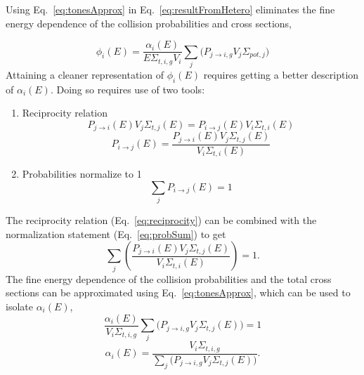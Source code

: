 \documentclass[10pt]{article}
\begin{document}
Using Eq.~\ref{eq:tonesApprox} in Eq.~\ref{eq:resultFromHetero} eliminates the fine energy dependence of the collision probabilities and cross sections,

\begin{equation}\phi_{i}(E)=\frac{\alpha_i(E)}{E\Sigma_{t,i,g}V_i}\sum\limits_j\Big(P_{j\rightarrow i,g}V_{j}\Sigma_{pot,j}\Big)\label{eq:phiWithAlpha}\end{equation}
Attaining a cleaner representation of $\phi_i(E)$ requires getting a better description of $\alpha_i(E)$. Doing so requires use of two tools:
  \begin{enumerate}
    \item Reciprocity relation
      \begin{equation*}P_{j\rightarrow i}(E)V_{j}\Sigma_{t,j}(E)=P_{i\rightarrow j}(E)V_{i}\Sigma_{t,i}(E)\end{equation*}
        \begin{equation}P_{i\rightarrow j}(E)=\frac{P_{j\rightarrow i}(E)V_{j}\Sigma_{t,j}(E)}{V_{i}\Sigma_{t,i}(E)}\label{eq:reciprocity}\end{equation}
    \item Probabilities normalize to 1
      \begin{equation}\sum\limits_{j}P_{i\rightarrow j}(E)=1\label{eq:probSum}\end{equation}
  \end{enumerate}


The reciprocity relation (Eq.~\ref{eq:reciprocity}) can be combined with the normalization statement (Eq.~\ref{eq:probSum}) to get
\begin{equation}\sum\limits_{j}\left(\frac{P_{j\rightarrow i}(E)V_{j}\Sigma_{t,j}(E)}{V_{i}\Sigma_{t,i}(E)}\right)=1.\label{eq:endOfReciprocity}\end{equation}
The fine energy dependence of the collision probabilities and the total cross sections can be approximated using Eq.~\ref{eq:tonesApprox}, which can be used to isolate $\alpha_i(E)$,
\begin{equation}\frac{\alpha_i(E)}{V_i\Sigma_{t,i,g}}\sum\limits_{j}\Big(P_{j\rightarrow i,g}V_{j}\Sigma_{t,j}(E)\Big)=1\end{equation}
\begin{equation}\alpha_i(E)=\frac{V_i\Sigma_{t,i,g}}{\sum\limits_{j}\Big(P_{j\rightarrow i,g}V_{j}\Sigma_{t,j}(E)\Big)}.\end{equation}
\end{document}
